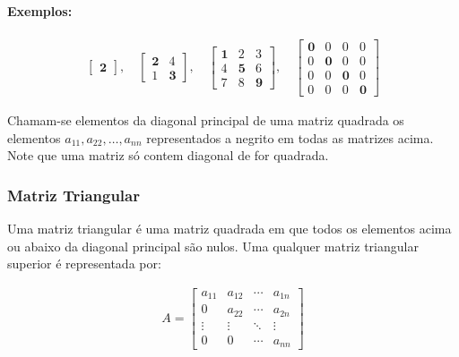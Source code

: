 \paragraph{Exemplos:}

\[
    \begin{matrix}
        \begin{bmatrix}
            \mathbf{2}
        \end{bmatrix},
        \quad
        \begin{bmatrix}
            \mathbf{2} & 4          \\
            1          & \mathbf{3}
        \end{bmatrix},
        \quad
        \begin{bmatrix}
            \mathbf{1} & 2          & 3          \\
            4          & \mathbf{5} & 6          \\
            7          & 8          & \mathbf{9}
        \end{bmatrix},
        \quad
        \begin{bmatrix}
            \mathbf{0} & 0          & 0          & 0          \\
            0          & \mathbf{0} & 0          & 0          \\
            0          & 0          & \mathbf{0} & 0          \\
            0          & 0          & 0          & \mathbf{0}
        \end{bmatrix}
    \end{matrix}
\]

Chamam-se elementos da diagonal principal de uma matriz quadrada os elementos \( a_{11}, a_{22}, \dots, a_{nn} \) representados a negrito em todas as matrizes acima. Note que uma matriz só contem diagonal de for quadrada.

\subsubsection{Matriz Triangular}
\indent

Uma matriz triangular é uma matriz quadrada em que todos os elementos acima ou abaixo da diagonal principal são nulos. Uma qualquer matriz triangular superior é representada por:

\[
    \begin{matrix}
        A = \begin{bmatrix}
                a_{11} & a_{12} & \cdots & a_{1n} \\
                0      & a_{22} & \cdots & a_{2n} \\
                \vdots & \vdots & \ddots & \vdots \\
                0      & 0      & \cdots & a_{nn}
            \end{bmatrix}
    \end{matrix}
\]


